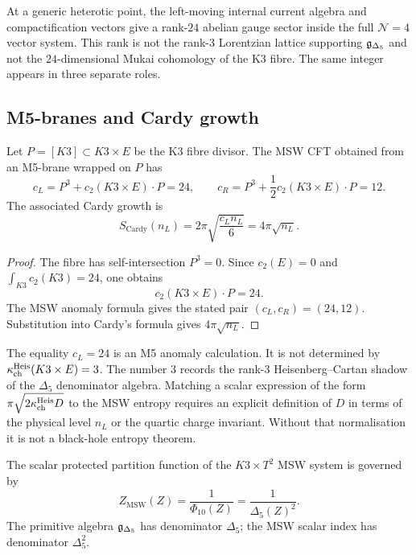 \begin{remark}
\label{rem:rank-24-phrase-heterotic-note}
At a generic heterotic point, the left-moving internal current algebra
and compactification vectors give a rank-$24$ abelian gauge sector inside
the full $\mathcal N=4$ vector system. This rank is not the rank-$3$
Lorentzian lattice supporting $\mathfrak{g}_{\Delta_5}$ and not the
$24$-dimensional Mukai cohomology of the K3 fibre. The same integer
appears in three separate roles.
\end{remark}

\subsection*{M5-branes and Cardy growth}
\label{subsec:m5-cardy-growth}

\begin{theorem}
\label{thm:msw-k3-fibre-central-charge}
Let $P=[K3]\subset K3\times E$ be the K3 fibre divisor. The MSW CFT
obtained from an M5-brane wrapped on $P$ has
\[
 c_L=P^3+c_2(K3\times E)\cdot P=24,\qquad
 c_R=P^3+\frac12 c_2(K3\times E)\cdot P=12 .
\]
The associated Cardy growth is
\[
 S_{\mathrm{Cardy}}(n_L)=2\pi\sqrt{\frac{c_L n_L}{6}}
 =4\pi\sqrt{n_L}.
\]
\end{theorem}

\begin{proof}
The fibre has self-intersection $P^3=0$. Since $c_2(E)=0$ and
$\int_{K3}c_2(K3)=24$, one obtains
\[
 c_2(K3\times E)\cdot P=24.
\]
The MSW anomaly formula gives the stated pair $(c_L,c_R)=(24,12)$.
Substitution into Cardy's formula gives $4\pi\sqrt{n_L}$.
\end{proof}

\begin{remark}
\label{rem:no-msw-from-kch-heis}
The equality $c_L=24$ is an M5 anomaly calculation. It is not determined
by $\kappa_{\mathrm{ch}}^{\mathrm{Heis}}(K3\times E)=3$. The number $3$ records the
rank-$3$ Heisenberg--Cartan shadow of the $\Delta_5$ denominator
algebra. Matching a scalar expression of the form
$\pi\sqrt{2\kappa_{\mathrm{ch}}^{\mathrm{Heis}}D}$ to the MSW entropy requires an
explicit definition of $D$ in terms of the physical level $n_L$ or the
quartic charge invariant. Without that normalisation it is not a
black-hole entropy theorem.
\end{remark}

\begin{theorem}
\label{thm:msw-phi10}
The scalar protected partition function of the $K3\times T^2$ MSW
system is governed by
\[
 Z_{\mathrm{MSW}}(Z)=\frac{1}{\Phi_{10}(Z)}
 =\frac{1}{\Delta_5(Z)^2}.
\]
The primitive algebra $\mathfrak{g}_{\Delta_5}$ has denominator $\Delta_5$; the
MSW scalar index has denominator $\Delta_5^2$.
\end{theorem}

